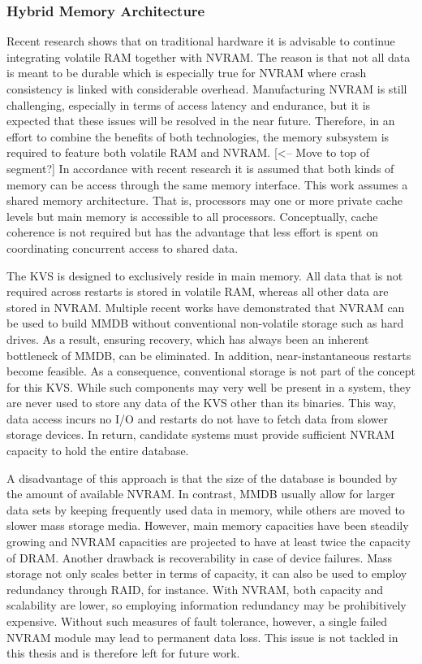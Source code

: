 \subsubsection{Hybrid Memory Architecture}

Recent research shows that on traditional hardware it is advisable to continue
integrating volatile RAM together with NVRAM. The reason is that not all data is
meant to be durable which is especially true for NVRAM where crash consistency
is linked with considerable overhead. Manufacturing NVRAM is still challenging,
especially in terms of access latency and endurance, but it is expected that
these issues will be resolved in the near future. Therefore, in an effort to
combine the benefits of both technologies, the memory subsystem is required to
feature both volatile RAM and NVRAM. [<-- Move to top of segment?] In accordance
with recent research it is assumed that both kinds of memory can be access
through the same memory interface. This work assumes a shared memory
architecture. That is, processors may one or more private cache levels but main
memory is accessible to all processors. Conceptually, cache coherence is not
required but has the advantage that less effort is spent on coordinating
concurrent access to shared data.

The KVS is designed to exclusively reside in main memory. All data that is not
required across restarts is stored in volatile RAM, whereas all other data are
stored in NVRAM. Multiple recent works have demonstrated that NVRAM can be used
to build MMDB without conventional non-volatile storage such as hard drives. As
a result, ensuring recovery, which has always been an inherent bottleneck of
MMDB, can be eliminated. In addition, near-instantaneous restarts become
feasible. As a consequence, conventional storage is not part of the concept for
this KVS. While such components may very well be present in a system, they are
never used to store any data of the KVS other than its binaries. This way, data
access incurs no I/O and restarts do not have to fetch data from slower storage
devices. In return, candidate systems must provide sufficient NVRAM capacity to
hold the entire database.

A disadvantage of this approach is that the size of the database is bounded by
the amount of available NVRAM. In contrast, MMDB usually allow for larger data
sets by keeping frequently used data in memory, while others are moved to slower
mass storage media. However, main memory capacities have been steadily growing
and NVRAM capacities are projected to have at least twice the capacity of DRAM.
Another drawback is recoverability in case of device failures. Mass storage not
only scales better in terms of capacity, it can also be used to employ
redundancy through RAID, for instance. With NVRAM, both capacity and scalability
are lower, so employing information redundancy may be prohibitively expensive.
Without such measures of fault tolerance, however, a single failed NVRAM module
may lead to permanent data loss. This issue is not tackled in this thesis and is
therefore left for future work.

